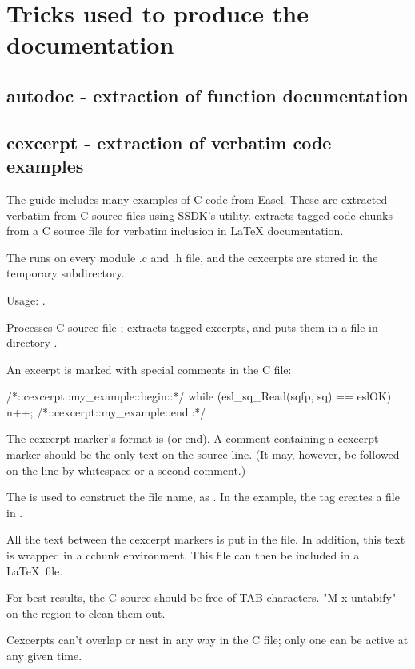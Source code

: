\section{Tricks used to produce the documentation}

\subsection{autodoc - extraction of function documentation}


\subsection{cexcerpt - extraction of verbatim code examples}

The guide includes many examples of C code from Easel. These are
extracted verbatim from C source files using SSDK's 
utility.  extracts tagged code chunks from a C source
file for verbatim inclusion in LaTeX documentation.

The  runs  on every
module .c and .h file, and the cexcerpts are stored in the temporary
 subdirectory.

Usage: .

Processes C source file ; extracts tagged excerpts, and
puts them in a file in directory .

An excerpt is marked with special comments in the C file:
\begin{cchunk}
/*::cexcerpt::my_example::begin::*/
   while (esl_sq_Read(sqfp, sq) == eslOK)
     { n++; }
/*::cexcerpt::my_example::end::*/
\end{cchunk}

The cexcerpt marker's format is  (or
end). A comment containing a cexcerpt marker should be the only text
on the source line. (It may, however, be followed on the line by
whitespace or a second comment.)

The  is used to construct the file name, as
.  In the example, the tag  creates
a file  in .

All the text between the cexcerpt markers is put in the file.  In
addition, this text is wrapped in a {cchunk} environment.  This file
can then be included in a \LaTeX\  file.

For best results, the C source should be free of TAB characters.
"M-x untabify" on the region to clean them out.

Cexcerpts can't overlap or nest in any way in the C file; only one can
be active at any given time.


